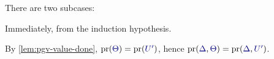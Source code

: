 \begin{case*}
  There are two subcases:
  \begin{subcase*}[$\tm{x}\in\tm{M}$]
    Immediately, from the induction hypothesis.
    \begin{mathpar}
    \end{mathpar}
  \end{subcase*}
  \begin{subcase*}[$\tm{x}\in\tm{N}$]
    By \cref{lem:pgv-value-done}, $\minpr(\ty{\Theta})=\minpr(\ty{U'})$, hence $\minpr(\ty{\Delta},\ty{\Theta})=\minpr(\ty{\Delta},\ty{U'})$.
    \begin{mathpar}
    \end{mathpar}
  \end{subcase*}
\end{case*}
